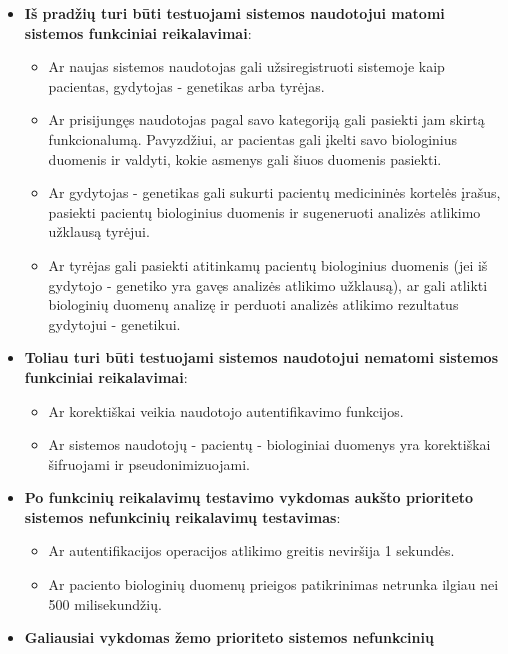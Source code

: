 \documentclass[12pt]{article}
\begin{document}
\begin{itemize}
    \item \textbf{Iš pradžių turi būti testuojami sistemos naudotojui matomi
    sistemos funkciniai reikalavimai}:
    \begin{itemize}[label=$\circ$]
        \item Ar naujas sistemos naudotojas gali užsiregistruoti sistemoje kaip
        pacientas, gydytojas - genetikas arba tyrėjas.
        \item Ar prisijungęs naudotojas pagal savo kategoriją gali pasiekti jam
        skirtą funkcionalumą. Pavyzdžiui, ar pacientas gali įkelti savo
        biologinius duomenis ir valdyti, kokie asmenys gali šiuos duomenis
        pasiekti.
        \item Ar gydytojas - genetikas gali sukurti pacientų medicininės
        kortelės įrašus, pasiekti pacientų biologinius duomenis ir sugeneruoti
        analizės atlikimo užklausą tyrėjui.
        \item Ar tyrėjas gali pasiekti atitinkamų pacientų biologinius duomenis
        (jei iš gydytojo -  genetiko yra gavęs analizės atlikimo užklausą), ar
        gali atlikti biologinių duomenų analizę ir perduoti analizės atlikimo
        rezultatus gydytojui - genetikui.
    \end{itemize}
    \item \textbf{Toliau turi būti testuojami sistemos naudotojui nematomi
    sistemos funkciniai reikalavimai}:
    \begin{itemize}[label=$\circ$]
        \item Ar korektiškai veikia naudotojo autentifikavimo funkcijos.
        \item Ar sistemos naudotojų - pacientų - biologiniai duomenys yra
        korektiškai šifruojami ir pseudonimizuojami.
    \end{itemize}
    \item \textbf{Po funkcinių reikalavimų testavimo vykdomas aukšto prioriteto
    sistemos ne\-funk\-ci\-nių reikalavimų testavimas}:
    \begin{itemize}[label=$\circ$]
        \item Ar autentifikacijos operacijos atlikimo greitis neviršija 1
        sekundės.
        \item Ar paciento biologinių duomenų prieigos patikrinimas netrunka
        ilgiau nei 500 milisekundžių.
    \end{itemize}
    \item \textbf{Galiausiai vykdomas žemo prioriteto sistemos nefunkcinių
}
\end{itemize}
\end{document}
